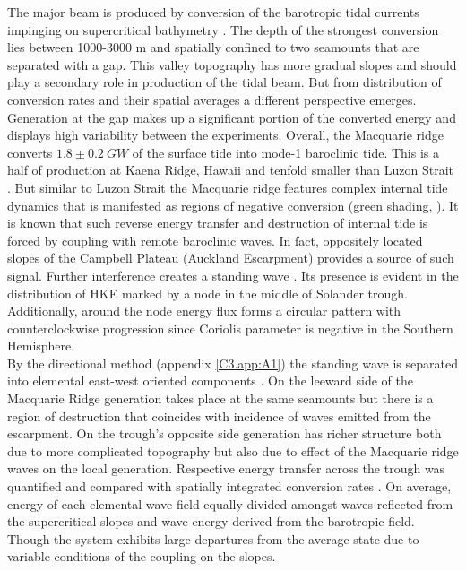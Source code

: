 \documentclass[12pt]{article}
\begin{document}
The major beam is produced by conversion of the barotropic tidal currents impinging on 
supercritical bathymetry . The depth of the strongest conversion lies between 
1000-3000 m and spatially confined to two seamounts that are separated with a gap. This valley 
topography has more gradual slopes and should play a secondary role in production of the tidal 
beam. But from distribution of conversion rates  and their spatial averages 
 a different perspective emerges. Generation at the gap makes up a 
significant portion of the converted energy and displays high variability between the 
experiments. Overall, the Macquarie ridge converts $1.8 \pm 0.2~GW$ of the surface tide into mode-1 
baroclinic tide. This is a half of production at Kaena Ridge, Hawaii \citep{carter2008energetics} 
and tenfold smaller than Luzon Strait \citep{kerry2014impact}. But similar to Luzon Strait the 
Macquarie ridge features complex internal tide dynamics that is manifested as regions of negative 
conversion (green shading, ). It is known \citep{Kelly2010a} that such 
reverse energy transfer and destruction of internal tide is forced by coupling with remote 
baroclinic waves. In fact, oppositely located slopes of the Campbell Plateau (Auckland Escarpment) 
provides a source of such signal. Further interference creates a standing wave 
. Its presence is evident in the distribution of HKE marked by a node in 
the middle of Solander trough. Additionally, around the node energy flux forms a circular pattern  
 with counterclockwise progression since Coriolis parameter is negative 
in the Southern Hemisphere.\\

By the directional method (appendix \ref{C3.app:A1}) the standing wave is separated 
into elemental east-west oriented components . On the leeward side 
of the Macquarie Ridge generation takes place at the same seamounts but there is a region of 
destruction that coincides with incidence of waves emitted from the escarpment. On the trough's 
opposite side generation has richer structure both due to more complicated topography but also due 
to effect of the Macquarie ridge waves on the local generation. Respective energy transfer across 
the trough was quantified and compared with spatially integrated conversion rates 
. On average, energy of each elemental wave field equally divided 
amongst waves reflected from the supercritical slopes and wave energy derived from the barotropic 
field. Though the system exhibits large departures from the average state due to variable 
conditions of the coupling on the slopes.\\
\end{document}

